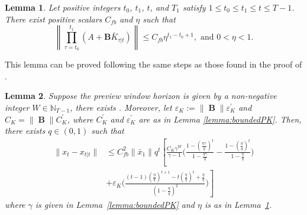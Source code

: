 \documentclass[letterpaper, 10 pt, conference]{ieeeconf}  %
\DeclareMathOperator{\contB}{\mathbf{B}}
\newtheorem{lemma}{Lemma}
\begin{document}
\begin{lemma}\label{lemma:multGain}
    Let positive integers $t_0$, $t_1$, $t$, and $T_1$ satisfy $1\leq t_{0} \leq t_{1}\leq t\leq T-1$. There exist positive scalars $C_{fb}$ and $\eta$ such that
    \begin{equation*}
        \left \| \prod_{\tau=t_{0}}^{t_{1}}(A+\mathbf{B}\bar{K}_{\tau|t})  \right\| \leq C_{fb}\eta^{t_{1}-t_{0}+1},\text{ and }0<\eta<1.
    \end{equation*}
\end{lemma}
This lemma can be proved following the same steps as those found in the proof of \cite[Appendix E,Proposition 2]{zhang_regret_2021}.
\begin{lemma}\label{lemma:distanceXt}
    Suppose the preview window horizon is given by a non-negative integer $W\in\mathbb{N}_{T-1}$, there exists . Moreover, let $\varepsilon_{K} := \|\contB\|\varepsilon_{K}^{'}$ and $C_{K} = \|\contB\|C_{K}^{'}$, where $C_{K}^{'}$ and $\varepsilon_{K}^{'}$ are as in Lemma \ref{lemma:boundedPK}. Then, there exists $q\in(0,1)$ such that
    \begin{equation*}
    \begin{split}
        \|x_{t}-x_{t|t}\| &\leq C_{fb}^{2}\|\bar{x}_{1}\|q^{t} \left [\frac{C_{K}\gamma^{W}}{\gamma-1}\bigg(\frac{1-(\frac{\eta\gamma}{q})^{t}}{1-\frac{\eta\gamma}{q}} - \frac{1-(\frac{\eta}{q})^{t}}{1-\frac{\eta}{q}} \bigg) \right .\\
        &\left . +\varepsilon_{K}\bigg(\frac{(t-1)(\frac{\eta}{q})^{t+1}-t(\frac{\eta}{q})^{t}+\frac{\eta}{q}}{(1-\frac{\eta}{q})^{2}}\bigg) \right ]  \end{split}
    \end{equation*}
    where $\gamma$ is given in Lemma~\ref{lemma:boundedPK} and $\eta$ is as in Lemma~\ref{lemma:multGain}.
\end{lemma}
\end{document}
